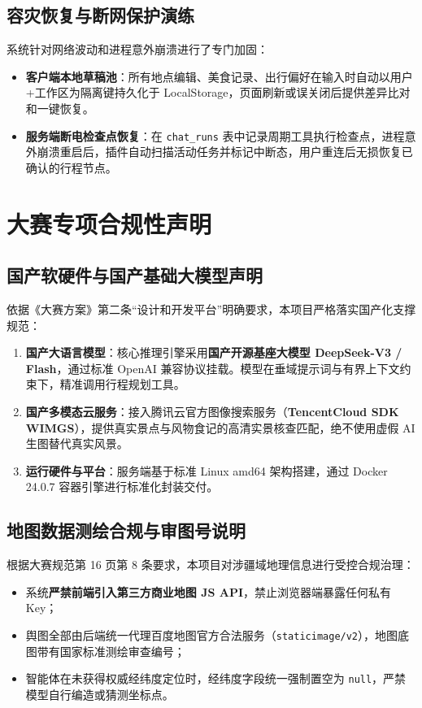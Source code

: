\documentclass[11pt,a4paper,UTF8]{ctexart}
\begin{document}
\subsection{容灾恢复与断网保护演练}
系统针对网络波动和进程意外崩溃进行了专门加固：
\begin{itemize}
    \item \textbf{客户端本地草稿池}：所有地点编辑、美食记录、出行偏好在输入时自动以用户+工作区为隔离键持久化于 LocalStorage，页面刷新或误关闭后提供差异比对和一键恢复。
    \item \textbf{服务端断电检查点恢复}：在 \texttt{chat\_runs} 表中记录周期工具执行检查点，进程意外崩溃重启后，插件自动扫描活动任务并标记中断态，用户重连后无损恢复已确认的行程节点。
\end{itemize}

\section{大赛专项合规性声明}

\subsection{国产软硬件与国产基础大模型声明}
依据《大赛方案》第二条“设计和开发平台”明确要求，本项目严格落实国产化支撑规范：
\begin{enumerate}
    \item \textbf{国产大语言模型}：核心推理引擎采用\textbf{国产开源基座大模型 DeepSeek-V3 / Flash}，通过标准 OpenAI 兼容协议挂载。模型在垂域提示词与有界上下文约束下，精准调用行程规划工具。
    \item \textbf{国产多模态云服务}：接入腾讯云官方图像搜索服务（\textbf{TencentCloud SDK WIMGS}），提供真实景点与风物食记的高清实景核查匹配，绝不使用虚假 AI 生图替代真实风景。
    \item \textbf{运行硬件与平台}：服务端基于标准 Linux amd64 架构搭建，通过 Docker 24.0.7 容器引擎进行标准化封装交付。
\end{enumerate}

\subsection{地图数据测绘合规与审图号说明}
根据大赛规范第 16 页第 8 条要求，本项目对涉疆域地理信息进行受控合规治理：
\begin{itemize}
    \item 系统\textbf{严禁前端引入第三方商业地图 JS API}，禁止浏览器端暴露任何私有 Key；
    \item 舆图全部由后端统一代理百度地图官方合法服务（\texttt{staticimage/v2}），地图底图带有国家标准测绘审查编号；
    \item 智能体在未获得权威经纬度定位时，经纬度字段统一强制置空为 \texttt{null}，严禁模型自行编造或猜测坐标点。
\end{itemize}
\end{document}
